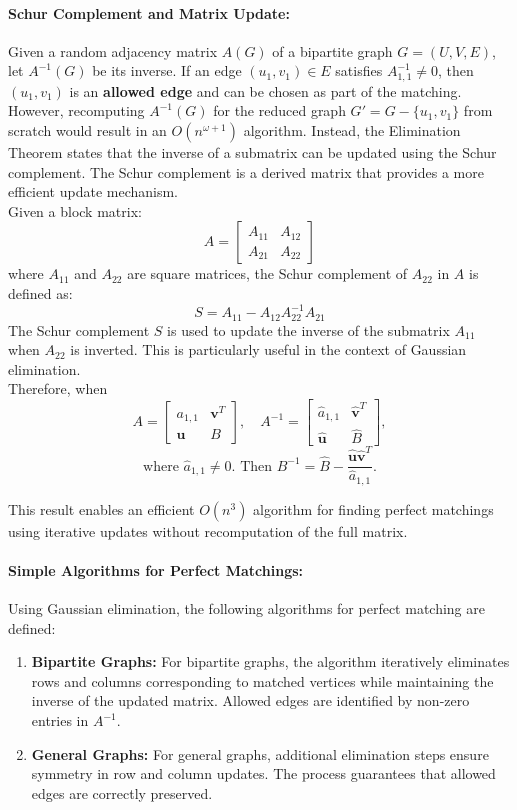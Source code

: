 \paragraph*{Schur Complement and Matrix Update:}
Given a random adjacency matrix \( A(G) \) of a bipartite graph \( G = (U, V, E) \), let \( A^{-1}(G) \) be its inverse. If an edge \( (u_1, v_1) \in E \) satisfies \( A^{-1}_{1,1} \neq 0 \), then \( (u_1, v_1) \) is an \textbf{allowed edge} and can be chosen as part of the matching. However, recomputing \( A^{-1}(G) \) for the reduced graph \( G' = G - \{u_1, v_1\} \) from scratch would result in an \( O(n^{\omega+1}) \) algorithm. Instead, the Elimination Theorem states that the inverse of a submatrix can be updated using the Schur complement. The Schur complement is a derived matrix that provides a more efficient update mechanism.\\
Given a block matrix:
\[
A = \begin{bmatrix}
A_{11} & A_{12} \\
A_{21} & A_{22}
\end{bmatrix}
\]
where \(A_{11}\) and \(A_{22}\) are square matrices, the Schur complement of \(A_{22}\) in \(A\) is defined as:
\[
S = A_{11} - A_{12} A_{22}^{-1} A_{21}
\]
The Schur complement \(S\) is used to update the inverse of the submatrix \(A_{11}\) when \(A_{22}\) is inverted. This is particularly useful in the context of Gaussian elimination.\\
Therefore, when 
\[
A = 
\begin{bmatrix}
a_{1,1} & \mathbf{v}^T \\
\mathbf{u} & B
\end{bmatrix},
\quad
A^{-1} = 
\begin{bmatrix}
\hat{a}_{1,1} & \hat{\mathbf{v}}^T \\
\hat{\mathbf{u}} & \hat{B}
\end{bmatrix},
\]
\[
\text{where } \hat{a}_{1,1} \neq 0. \text{ Then } B^{-1} = \hat{B} - \frac{\hat{\mathbf{u}} \hat{\mathbf{v}}^T}{\hat{a}_{1,1}}.
\]

\noindent This result enables an efficient \( O(n^3) \) algorithm for finding perfect matchings using iterative updates without recomputation of the full matrix.

\paragraph*{Simple Algorithms for Perfect Matchings:}
Using Gaussian elimination, the following algorithms for perfect matching are defined:
\begin{enumerate}
    \item \textbf{Bipartite Graphs:} For bipartite graphs, the algorithm iteratively eliminates rows and columns corresponding to matched vertices while maintaining the inverse of the updated matrix. Allowed edges are identified by non-zero entries in \( A^{-1} \).
    \item \textbf{General Graphs:} For general graphs, additional elimination steps ensure symmetry in row and column updates. The process guarantees that allowed edges are correctly preserved.
\end{enumerate}

